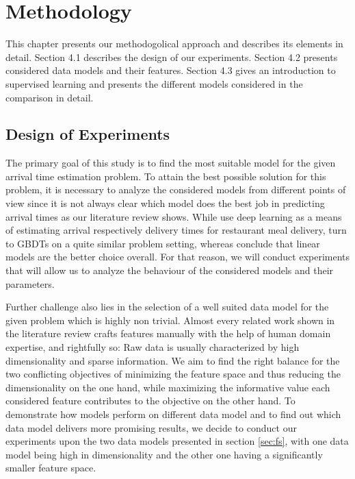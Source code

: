 \chapter{Methodology}\label{chap:method}
This chapter presents our methodogolical approach and describes its elements in detail. 
Section 4.1 describes the design of our experiments. 
Section 4.2 presents considered data models and their features.
Section 4.3 gives an introduction to supervised learning and presents the different models considered in the comparison in detail.

\section{Design of Experiments}\label{sec:design}

The primary goal of this study is to find the most suitable model for the given arrival time estimation problem. 
To attain the best possible solution for this problem, it is necessary to analyze the considered models from different points of view since it is not always clear which model does the best job in predicting arrival times as our literature review shows. 
While \cite{Zhu2020_OFCTE_DL} use deep learning as a means of estimating arrival respectively delivery times for restaurant meal delivery, \cite{Hildebrandt2020_EAT} turn to GBDTs on a quite similar problem setting, whereas \cite{Liu2018_LM_PLM} conclude that linear models are the better choice overall.
For that reason, we will conduct experiments that will allow us to analyze the behaviour of the considered models and their parameters. 

Further challenge also lies in the selection of a well suited data model for the given problem which is highly non trivial. 
Almost every related work shown in the literature review crafts features manually with the help of human domain expertise, and rightfully so: Raw data is usually characterized by high dimensionality and sparse information. We aim to find the right balance for the two conflicting objectives of minimizing the feature space and thus reducing the dimensionality on the one hand, while maximizing the informative value each considered feature contributes to the objective on the other hand. 
To demonstrate how models perform on different data model and to find out which data model delivers more promising results, we decide to conduct our experiments upon the two data models presented in section \ref{sec:fs}, with one data model being high in dimensionality and the other one having a significantly smaller feature space.

